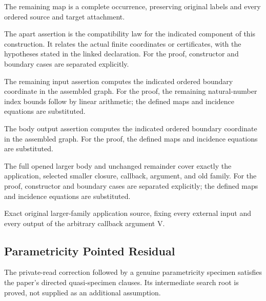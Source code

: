 The remaining map is a complete occurrence, preserving original labels and every ordered source and target attachment.
\par{}

The apart assertion is the compatibility law for the indicated component of this construction. It relates the actual finite coordinates or certificates, with the hypotheses stated in the linked declaration.
For the proof, constructor and boundary cases are separated explicitly.
\par{}

The remaining input assertion computes the indicated ordered boundary coordinate in the assembled graph.
For the proof, the remaining natural-number index bounds follow by linear arithmetic; the defined maps and incidence equations are substituted.
\par{}

The body output assertion computes the indicated ordered boundary coordinate in the assembled graph.
For the proof, the defined maps and incidence equations are substituted.
\par{}

The full opened larger body and unchanged remainder cover exactly the application, selected smaller closure, callback, argument, and old family.
For the proof, constructor and boundary cases are separated explicitly; the defined maps and incidence equations are substituted.
\par{}

Exact original larger-family application source, fixing every external input and every output of the arbitrary callback argument V.
\par{}

\subsection{Parametricity Pointed Residual}
The private-read correction followed by a genuine parametricity specimen satisfies the paper's directed quasi-specimen clauses. Its intermediate search root is proved, not supplied as an additional assumption.

